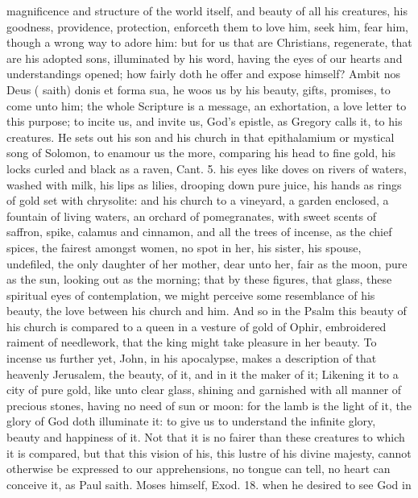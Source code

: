 {magnificence and structure of the world itself, and beauty of all his
creatures, his goodness, providence, protection, enforceth them to love
him, seek him, fear him, though a wrong way to adore him: but for us
that are Christians, regenerate, that are his adopted sons, illuminated
by his word, having the eyes of our hearts and understandings opened;
how fairly doth he offer and expose himself? Ambit nos Deus (\Austin{}
saith) donis et forma sua, he woos us by his beauty, gifts, promises,
to come unto him; the whole Scripture is a message, an
exhortation, a love letter to this purpose; to incite us, and invite
us, God's epistle, as Gregory calls it, to his creatures. He sets
out his son and his church in that epithalamium or mystical song of
Solomon, to enamour us the more, comparing his head to fine gold, his
locks curled and black as a raven, Cant.  5. his eyes like doves on
rivers of waters, washed with milk, his lips as lilies, drooping down
pure juice, his hands as rings of gold set with chrysolite: and his
church to a vineyard, a garden enclosed, a fountain of living waters,
an orchard of pomegranates, with sweet scents of saffron, spike,
calamus and cinnamon, and all the trees of incense, as the chief
spices, the fairest amongst women, no spot in her, his sister,
his spouse, undefiled, the only daughter of her mother, dear unto her,
fair as the moon, pure as the sun, looking out as the morning; that by
these figures, that glass, these spiritual eyes of contemplation, we
might perceive some resemblance of his beauty, the love between his
church and him. And so in the  Psalm this beauty of his church is
compared to a queen in a vesture of gold of Ophir, embroidered raiment
of needlework, that the king might take pleasure in her beauty. To
incense us further yet, John, in his apocalypse, makes a
description of that heavenly Jerusalem, the beauty, of it, and in it
the maker of it; Likening it to a city of pure gold, like unto clear
glass, shining and garnished with all manner of precious stones, having
no need of sun or moon: for the lamb is the light of it, the glory of
God doth illuminate it: to give us to understand the infinite glory,
beauty and happiness of it. Not that it is no fairer than these
creatures to which it is compared, but that this vision of his, this
lustre of his divine majesty, cannot otherwise be expressed to our
apprehensions, no tongue can tell, no heart can conceive it, as Paul
saith. Moses himself, Exod.  18. when he desired to see God in
}
